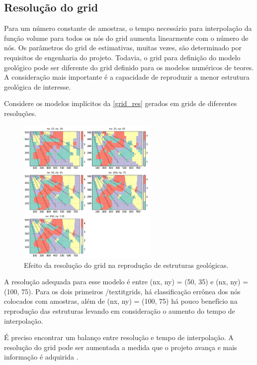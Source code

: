 \subsection{Resolução do grid}

Para um número constante de amostras, o tempo necessário para interpolação da função volume para todos os nós do grid aumenta linearmente com o número de nós. Os parâmetros do grid de estimativas, muitas vezes, são determinado por requisitos de engenharia do projeto. Todavia, o grid para definição do modelo geológico pode ser diferente do grid definido para os modelos numéricos de teores. A consideração mais importante é a capacidade de reproduzir a menor estrutura geológica de interesse.

Considere os modelos implícitos da \autoref{grid_res} gerados em grids de diferentes resoluções.

\begin{figure}[H]
	\caption{\label{grid_res}Efeito da resolução do grid na reprodução de estruturas geológicas.}
	\begin{center}
		\includegraphics[width=0.6\textwidth]{capitulo_2/grid_res.png}
	\end{center}
\end{figure}

A resolução adequada para esse modelo é entre (nx, ny) = (50, 35) e (nx, ny) = (100, 75). Para os dois primeiros /textit{grids}, há classificação errônea dos nós colocados com amostras, além de (nx, ny) = (100, 75) há pouco benefício na reprodução das estruturas levando em consideração o aumento do tempo de interpolação.

É preciso encontrar um balanço entre resolução e tempo de interpolação. A resolução do grid pode ser aumentada a medida que o projeto avança e mais informação é adquirida \cite{martin2017implicitmodeling}.

